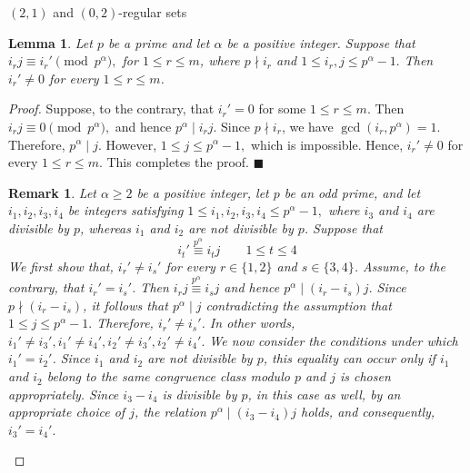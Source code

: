 \documentclass[12pt]{article}
\makeatletter
\renewcommand{\subsection}{\@startsection{subsection}{2}{0mm}{7mm}{4mm}
{\bf\large}}
\newtheorem{lemA}[propA]{Lemma}
\newtheorem{remA}[propA]{Remark}
\makeatother
\begin{document}
   \subsection{$(2,1)$ and $(0,2)$-regular sets}
    \begin{lemA}\label{lem:nonzero1}
   	Let $p$ be a prime and let $\alpha$ be a positive integer. Suppose that
   	$
   	i_rj\equiv i_r' \pmod{p^\alpha},
   	$
   	for $1\le r\le m$, where $p\nmid i_r$ and
   	$
   	1\le i_r,j\le p^\alpha-1.
   	$
   	Then $i_r'\neq0$ for every $1\le r\le m$.
   \end{lemA}
   \begin{proof}
   	Suppose, to the contrary, that $i_r'=0$ for some $1\le r\le m$. Then
   	$
   	i_rj\equiv0\pmod{p^\alpha},
   	$
   	and hence
   	$
   	p^\alpha\mid i_rj.
   	$
   	Since $p\nmid i_r$, we have
   	$
   	\gcd(i_r,p^\alpha)=1.
   	$
   	Therefore,
   	$
   	p^\alpha\mid j.
   	$
   	However,
   	$
   	1\le j\le p^\alpha-1,
   	$
   	which is impossible. Hence, $i_r'\neq0$ for every $1\le r\le m$. This completes the proof.
   	\hfill$\blacksquare$
   	\begin{remA}\label{rem:indices-congruence}
   		Let $\alpha \ge 2$ be a positive integer, let $p$ be an odd prime, and let
   		$i_1,i_2,i_3,i_4$ be integers satisfying
   		$
   		1\le i_1,i_2,i_3,i_4\le p^\alpha-1,
   		$
   		where $i_3$ and $i_4$ are divisible by $p$, whereas $i_1$ and $i_2$ are not divisible by $p$. Suppose that
   		\[
   		i_t'\stackrel{p^\alpha}{\equiv}i_tj \qquad  	1\le t\le 4
   		\]
   		We first show that,
   		$
   		i_r' \ne i_s'
   		$
   		for every $r\in\{1,2\}$ and $s\in\{3,4\}$.
   		Assume, to the contrary, that $i_r'=i_s'$. Then
   		$
   		i_rj\stackrel{p^\alpha}{\equiv}i_sj
   		$
   		and hence
   		$
   		p^\alpha\mid(i_r-i_s)j.
   		$
   		Since $p\nmid(i_r-i_s)$, it follows that
   		$
   		p^\alpha\mid j
   		$
   		contradicting the assumption that
   		$
   		1\le j\le p^\alpha-1.
   		$
   		Therefore, $i_r'\ne i_s'$. In other words,
   		$
   		i_1'\ne i_3',
   		i_1'\ne i_4',
   		i_2'\ne i_3',
   		i_2'\ne i_4'.
   		$
   		We now consider the conditions under which $i_1'=i_2'$. Since $i_1$ and $i_2$ are not divisible by $p$, this equality can occur only if $i_1$ and $i_2$ belong to the same congruence class modulo $p$ and $j$ is chosen appropriately. Since $i_3-i_4$ is divisible by $p$, in this case as well, by an appropriate choice of $j$, the relation
   		$
   		p^\alpha\mid(i_3-i_4)j
   		$
   		holds, and consequently,
   		$
   		i_3'=i_4'.
   		$
   	\end{remA}

\end{proof}
\end{document}
